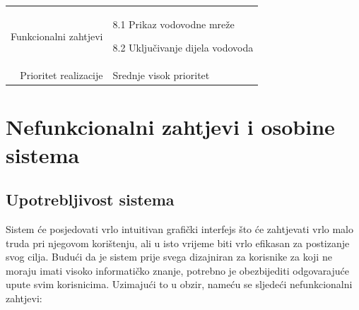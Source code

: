 \documentclass[]{report}
\begin{document}
\begin{tabular}{rp{}}
\\
Funkcionalni zahtjevi &

\begin{compactitem} 
    \item 8.1 Prikaz vodovodne mreže
    \item 8.2 Uključivanje dijela vodovoda
\end{compactitem}

\\
Prioritet realizacije &
\hspace{12pt} Srednje visok prioritet
\\
\end{tabular}



\newpage

\section{Nefunkcionalni zahtjevi i osobine sistema}
\subsection{Upotrebljivost sistema}

Sistem će posjedovati vrlo intuitivan grafički interfejs što će zahtjevati vrlo malo truda pri njegovom korištenju, ali u isto vrijeme biti vrlo efikasan za postizanje svog cilja. Budući da je sistem prije svega dizajniran za korisnike za koji ne moraju  imati visoko informatičko znanje, potrebno je obezbijediti odgovarajuće upute svim korisnicima. Uzimajući to u obzir, nameću se sljedeći nefunkcionalni zahtjevi: 
 
\end{document}
